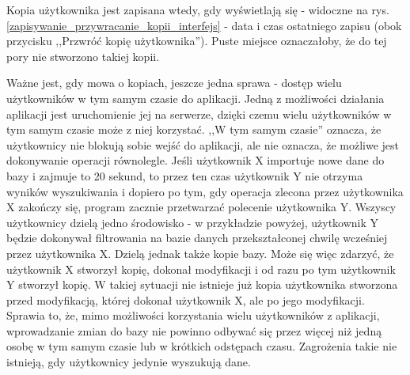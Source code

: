 \documentclass[12pt, twoside, hidelinks]{report}
\begin{document}
Kopia użytkownika jest zapisana wtedy, gdy wyświetlają się - widoczne na rys. \ref{zapisywanie_przywracanie_kopii_interfejs} - data i czas ostatniego zapisu (obok przycisku ,,Przwróć kopię użytkownika''). Puste miejsce oznaczałoby, że do tej pory nie stworzono takiej kopii. \par
Ważne jest, gdy mowa o kopiach, jeszcze jedna sprawa - dostęp wielu użytkowników w tym samym czasie do aplikacji. Jedną z możliwości działania aplikacji jest uruchomienie jej na serwerze, dzięki czemu wielu użytkowników w tym samym czasie może z niej korzystać. ,,W tym samym czasie'' oznacza, że użytkownicy nie blokują sobie wejść do aplikacji, ale nie oznacza, że możliwe jest dokonywanie operacji równolegle. Jeśli użytkownik X importuje nowe dane do bazy i zajmuje to 20 sekund, to przez ten czas użytkownik Y nie otrzyma wyników wyszukiwania i dopiero po tym, gdy operacja zlecona przez użytkownika X zakończy się, program zacznie przetwarzać polecenie użytkownika Y. Wszyscy użytkownicy dzielą jedno środowisko - w przykładzie powyżej, użytkownik Y będzie dokonywał filtrowania na bazie danych przekształconej chwilę wcześniej przez użytkownika X. Dzielą jednak także kopie bazy. Może się więc zdarzyć, że użytkownik X stworzył kopię, dokonał modyfikacji i od razu po tym użytkownik Y stworzył kopię. W takiej sytuacji nie istnieje już kopia użytkownika stworzona przed modyfikacją, której dokonał użytkownik X, ale po jego modyfikacji. Sprawia to, że, mimo możliwości korzystania wielu użytkowników z aplikacji, wprowadzanie zmian do bazy nie powinno odbywać się przez więcej niż jedną osobę w tym samym czasie lub w krótkich odstępach czasu. Zagrożenia takie nie istnieją, gdy użytkownicy jedynie wyszukują dane.
\end{document}
